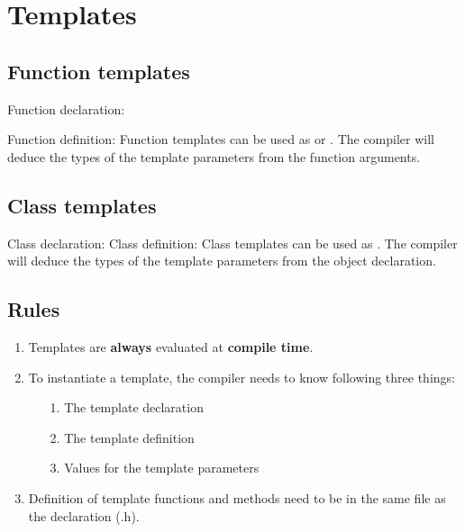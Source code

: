 \section{Templates}
\subsection{Function templates}
Function declaration:
\vspace{-2mm}
\vspace{-2mm}

Function definition:
\vspace{-2mm}
\vspace{-2mm}
Function templates can be used as  or . The compiler will deduce the types of the template parameters from the function arguments.

\subsection{Class templates}
Class declaration:
\vspace{-2mm}
\vspace{-2mm}
Class definition:
\vspace{-2mm}
\vspace{-2mm}
Class templates can be used as . The compiler will deduce the types of the template parameters from the object declaration.

\subsection{Rules}
\begin{enumerate}
    \item Templates are \textbf{always} evaluated at \textbf{compile time}.
    \item To instantiate a template, the compiler needs to know following three things:
    \begin{enumerate}
        \item[1.] The template declaration
        \item[2.] The template definition
        \item[3.] Values for the template parameters
    \end{enumerate}
    \item Definition of template functions and methods need to be in the same file as the declaration (.h).
\end{enumerate}